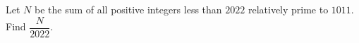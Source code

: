 Let $N$ be the sum of all positive integers less than $2022$ relatively prime to $1011$. Find $\dfrac{N}{2022}$.
